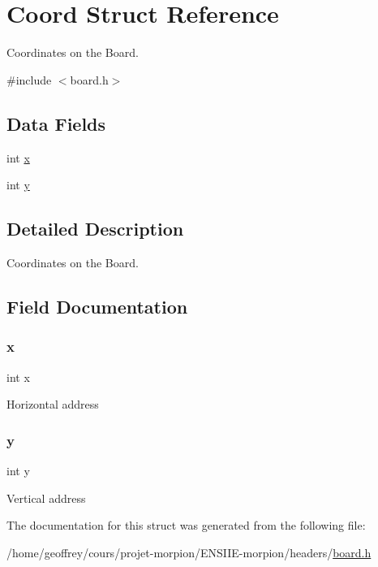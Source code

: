 \hypertarget{struct_coord}{}\section{Coord Struct Reference}
\label{struct_coord}


Coordinates on the Board.  




{\ttfamily \#include $<$board.\+h$>$}

\subsection*{Data Fields}
\begin{DoxyCompactItemize}
\item 
int \hyperlink{struct_coord_a6150e0515f7202e2fb518f7206ed97dc}{x}
\item 
int \hyperlink{struct_coord_a0a2f84ed7838f07779ae24c5a9086d33}{y}
\end{DoxyCompactItemize}


\subsection{Detailed Description}
Coordinates on the Board. 

\subsection{Field Documentation}
\mbox{\label{struct_coord_a6150e0515f7202e2fb518f7206ed97dc}} 
\subsubsection{\texorpdfstring{x}{x}}
{\footnotesize\ttfamily int x}

Horizontal address \mbox{\label{struct_coord_a0a2f84ed7838f07779ae24c5a9086d33}} 
\subsubsection{\texorpdfstring{y}{y}}
{\footnotesize\ttfamily int y}

Vertical address 

The documentation for this struct was generated from the following file\+:\begin{DoxyCompactItemize}
\item 
/home/geoffrey/cours/projet-\/morpion/\+E\+N\+S\+I\+I\+E-\/morpion/headers/\hyperlink{board_8h}{board.\+h}\end{DoxyCompactItemize}
